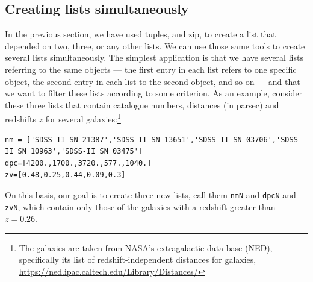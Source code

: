 \documentclass[twocolumn,apj]{openjournal}
\begin{document}
\subsection{Creating lists simultaneously}

\label{firstGalaxyEx}
In the previous section, we have used tuples, and zip, to create a list that depended on two, three, or any other lists. We can use those same tools to create several lists simultaneously. The simplest application is that we have several lists referring to the same objects --- the first entry in each list refers to one specific object, the second entry in each list to the second object, and so on --- and that we want to filter these lists according to some criterion. As an example, consider these three lists that contain catalogue numbers, distances (in parsec) and redshifts $z$ for several galaxies:\footnote{
The galaxies are taken from NASA's extragalactic data base (NED), specifically its list of redshift-independent distances for galaxies, \href{https://ned.ipac.caltech.edu/Library/Distances/}{https://ned.ipac.caltech.edu/Library/Distances/}}
\begin{lstlisting}
nm = ['SDSS-II SN 21387','SDSS-II SN 13651','SDSS-II SN 03706','SDSS-II SN 10963','SDSS-II SN 03475']
dpc=[4200.,1700.,3720.,577.,1040.]
zv=[0.48,0.25,0.44,0.09,0.3]
\end{lstlisting}
On this basis, our goal is to create three new lists, call them \verb|nmN| and \verb|dpcN| and \verb|zvN|, which contain only those of the galaxies with a redshift greater than $z=0.26$.
\end{document}
